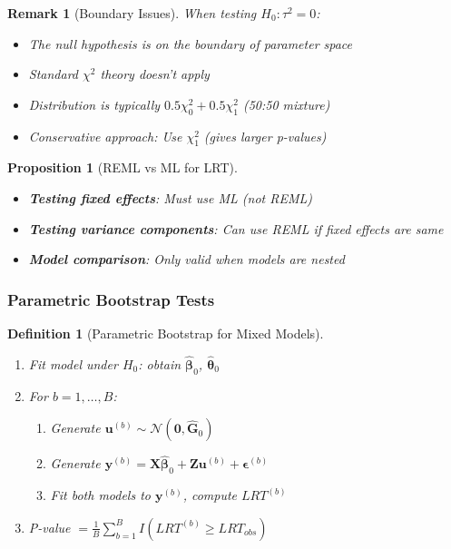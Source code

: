 \documentclass{article}
\newtheorem{definition}{Definition}
\newtheorem{proposition}{Proposition}
\newtheorem{remark}{Remark}
\begin{document}
\begin{remark}[Boundary Issues]
When testing $H_0: \tau^2 = 0$:
\begin{itemize}
    \item The null hypothesis is on the boundary of parameter space
    \item Standard $\chi^2$ theory doesn't apply
    \item Distribution is typically $0.5\chi^2_0 + 0.5\chi^2_1$ (50:50 mixture)
    \item Conservative approach: Use $\chi^2_1$ (gives larger p-values)
\end{itemize}
\end{remark}

\begin{proposition}[REML vs ML for LRT]
\begin{itemize}
    \item \textbf{Testing fixed effects}: Must use ML (not REML)
    \item \textbf{Testing variance components}: Can use REML if fixed effects are same
    \item \textbf{Model comparison}: Only valid when models are nested
\end{itemize}
\end{proposition}

\subsubsection{Parametric Bootstrap Tests}

\begin{definition}[Parametric Bootstrap for Mixed Models]
\begin{enumerate}
    \item Fit model under $H_0$: obtain $\hat{\boldsymbol{\beta}}_0$, $\hat{\boldsymbol{\theta}}_0$
    \item For $b = 1, \ldots, B$:
    \begin{enumerate}
        \item Generate $\mathbf{u}^{(b)} \sim \mathcal{N}(\mathbf{0}, \hat{\mathbf{G}}_0)$
        \item Generate $\mathbf{y}^{(b)} = \mathbf{X}\hat{\boldsymbol{\beta}}_0 + \mathbf{Z}\mathbf{u}^{(b)} + \boldsymbol{\epsilon}^{(b)}$
        \item Fit both models to $\mathbf{y}^{(b)}$, compute $LRT^{(b)}$
    \end{enumerate}
    \item P-value $= \frac{1}{B}\sum_{b=1}^B I(LRT^{(b)} \geq LRT_{obs})$
\end{enumerate}
\end{definition}
\end{document}
